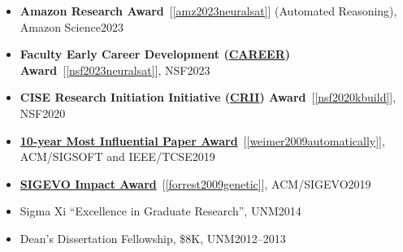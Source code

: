 \documentclass[11pt]{article}
\begin{document}
\begin{itemize}
  \item \textbf{Amazon Research Award}~[\ref{amz2023neuralsat}] (Automated Reasoning), Amazon Science\hfill 2023
\item \textbf{Faculty Early Career Development (\href{https://www.nsf.gov/awardsearch/showAward?AWD_ID=2238133}{CAREER}) Award}~[\ref{nsf2023neuralsat}], NSF\hfill 2023

\item \textbf{CISE Research Initiation Initiative (\href{https://www.nsf.gov/awardsearch/showAward?AWD_ID=1948536}{CRII}) Award}~[\ref{nsf2020kbuild}], NSF\hfill 2020

\item \href{https://www.sigsoft.org/awards/icseMIPAward.html}{\textbf{10-year Most Influential Paper Award}}~[\ref{weimer2009automatically}], ACM/SIGSOFT and IEEE/TCSE\hfill 2019

  
\item \href{https://sig.sigevo.org/index.html/tiki-index.php?page=SIGEVO+Impact+Award}{\textbf{SIGEVO Impact Award}}~[\ref{forrest2009genetic}], ACM/SIGEVO\hfill 2019

\item  Sigma Xi ``Excellence in Graduate Research'', UNM\hfill 2014
\item Dean's Dissertation Fellowship, \$8K, UNM\hfill 2012--2013


\end{itemize}
\end{document}
